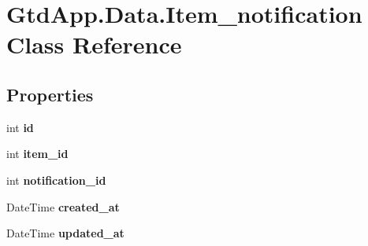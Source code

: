 \hypertarget{class_gtd_app_1_1_data_1_1_item__notification}{}\section{Gtd\+App.\+Data.\+Item\+\_\+notification Class Reference}
\label{class_gtd_app_1_1_data_1_1_item__notification}
\subsection*{Properties}
\begin{DoxyCompactItemize}
\item 
\mbox{\label{class_gtd_app_1_1_data_1_1_item__notification_a850039c5d6ffd051ea8d477b45e2be39}} 
int {\bfseries id}
\item 
\mbox{\label{class_gtd_app_1_1_data_1_1_item__notification_afb93b9e12ee1cddc76891b1705b05233}} 
int {\bfseries item\+\_\+id}
\item 
\mbox{\label{class_gtd_app_1_1_data_1_1_item__notification_a05754b688bd11599c3ebf0eb6d190868}} 
int {\bfseries notification\+\_\+id}
\item 
\mbox{\label{class_gtd_app_1_1_data_1_1_item__notification_a26b174cb4188edb8538b4d876fee5f23}} 
Date\+Time {\bfseries created\+\_\+at}
\item 
\mbox{\label{class_gtd_app_1_1_data_1_1_item__notification_a06fb278bf0d305484a8343bd1953fe77}} 
Date\+Time {\bfseries updated\+\_\+at}
\item 
\mbox{\label{class_gtd_app_1_1_data_1_1_item__notification_aa845abf76eca7aaf57acd1b0ab3c5a54}} 

\end{DoxyCompactItemize}
